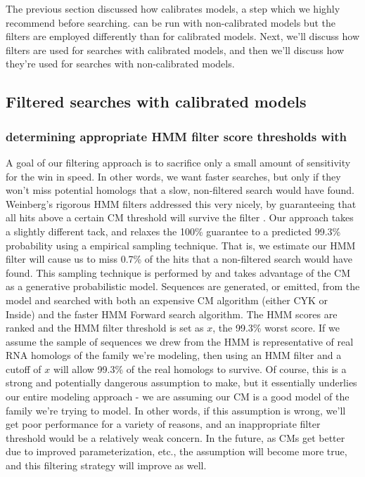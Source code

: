 The previous section discussed how  calibrates
models, a step which we highly recommend before searching.
 can be run with non-calibrated models but the 
filters are employed differently than for calibrated models.  Next,
we'll discuss how filters are used for searches with calibrated
models, and then we'll discuss how they're used for searches with
non-calibrated models.

\subsection{Filtered searches with calibrated models}

\subsubsection{determining appropriate HMM filter score thresholds with }
A goal of our filtering approach is to sacrifice only a small amount
of sensitivity for the win in speed. In other words, we want faster
searches, but only if they won't miss potential homologs that a slow,
non-filtered search would have found.  Weinberg's rigorous HMM filters
addressed this very nicely, by guaranteeing that all hits above a
certain CM threshold will survive the filter
\cite{WeinbergRuzzo04}. Our approach takes a slightly different tack,
and relaxes the 100\% guarantee to a predicted 99.3\% probability using a
empirical sampling technique. That is, we estimate our HMM filter will
cause us to miss 0.7\% of the hits that a non-filtered search would have
found. This sampling technique is performed by  and
takes advantage of the CM as a generative probabilistic model.
Sequences are generated, or emitted, from the model and searched with
both an expensive CM algorithm (either CYK or Inside) and the faster
HMM Forward search algorithm. The HMM scores are ranked and the HMM
filter threshold is set as $x$, the 99.3\% worst score. If we assume
the sample of sequences we drew from the HMM is representative of real
RNA homologs of the family we're modeling, then using an HMM filter
and a cutoff of $x$ will allow 99.3\% of the real homologs to
survive. 
Of course, this is a strong and potentially dangerous
assumption to make, but it essentially underlies our entire modeling
approach - we are assuming our CM is a good model of the family
we're trying to model.  In other words, if this assumption is wrong,
we'll get poor performance for a variety of reasons, and an
inappropriate filter threshold would be a relatively weak concern.  In
the future, as CMs get better due to improved parameterization, etc.,
the assumption will become more true, and this filtering strategy will
improve as well. 


